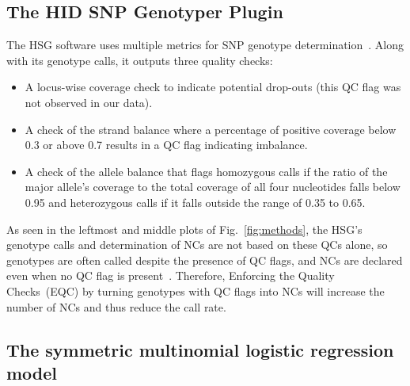 \documentclass[preprint,5p,times,11pt]{elsarticle}
\begin{document}
\subsection{The HID SNP Genotyper Plugin}
The HSG software uses multiple metrics for SNP genotype determination~\cite[p.~35]{hid}.
Along with its genotype calls, it outputs three quality checks:
\begin{itemize}
\item A locus-wise coverage check to indicate potential drop-outs (this QC flag was not observed in our data).
\item A check of the strand balance where a percentage of positive coverage below 0.3 or above 0.7 results in a QC flag indicating imbalance.
\item A check of the allele balance that flags homozygous calls if the ratio of the major allele's coverage to the total coverage of all four nucleotides falls below 0.95 and heterozygous calls if it falls outside the range of 0.35 to 0.65.
\end{itemize}
As seen in the leftmost and middle plots of Fig.~\ref{fig:methods}, the HSG's genotype calls and determination of NCs are not based on these QCs alone, so genotypes are often called despite the presence of QC flags, and NCs are declared even when no QC flag is present~\cite[p.~35]{hid}.
Therefore, Enforcing the Quality Checks~(EQC) by turning genotypes with QC flags into NCs will increase the number of NCs and thus reduce the call rate.


\subsection{The symmetric multinomial logistic regression model}
\end{document}
